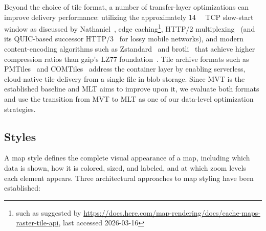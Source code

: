 Beyond the choice of tile format, a number of transfer-layer optimizations can improve delivery performance:
utilizing the approximately \qty{14}{\kilo\byte} TCP slow-start window as discussed by Nathaniel~\cite{nathanielWhyYourWebsite2022}, edge caching\footnote{such as suggested by \url{https://docs.here.com/map-rendering/docs/cache-maps-raster-tile-api}, last accessed 2026-03-16}, HTTP/2 multiplexing~\cite{belsheHypertextTransferProtocol2015} (and its QUIC-based successor HTTP/3~\cite{bishopHTTP32022} for lossy mobile networks), and modern content-encoding algorithms such as Zstandard~\cite{colletZstandardCompressionApplication2021} and brotli~\cite{alakuijalaBrotliCompressedData2016} that achieve higher compression ratios than gzip's LZ77 foundation~\cite{zivUniversalAlgorithmSequential1977}.
Tile archive formats such as PMTiles~\cite{PMTilesConceptsProtomaps} and COMTiles~\cite{tremmelCOMTILESCASESTUDY2023} address the container layer by enabling serverless, cloud-native tile delivery from a single file in blob storage.
Since \ac{MVT} is the established baseline and \ac{MLT} aims to improve upon it, we evaluate both formats and use the transition from \ac{MVT} to \ac{MLT} as one of our data-level optimization strategies.

\subsection{Styles}\label{sec:styles}

A map style defines the complete visual appearance of a map, including which data is shown, how it is colored, sized, and labeled, and at which zoom levels each element appears.
Three architectural approaches to map styling have been established:

